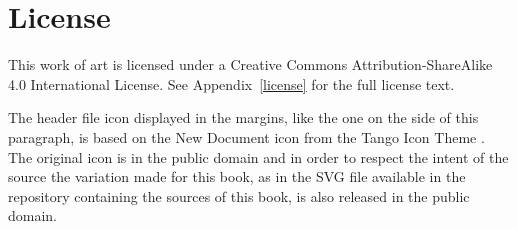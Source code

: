 \section{License}
This work of art is licensed under a Creative Commons
Attribution-ShareAlike 4.0 International License. See
Appendix~\ref{license} for the full license text.

%
%
The header file icon displayed in the margins, like the one on the
side of this paragraph, is based on the New Document icon from the
Tango Icon Theme \cite{tango-icon-theme}. The original icon is in the
public domain and in order to respect the intent of the source the
variation made for this book, as in the SVG file available in the
repository containing the sources of this book, is also released in
the public domain.

\renewcommand*\thesection{\arabic{chapter}.\arabic{section}}
